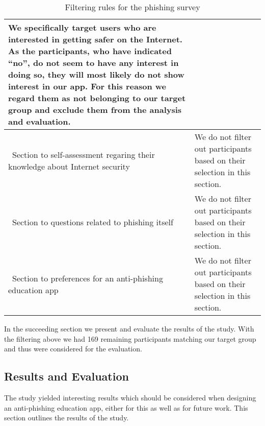 \begin{table}[hHtbp]
\begin{tabular}{ | p{4.5cm} | p{10cm} |}
 We specifically target users who are interested in getting safer on the Internet.
 As the participants, who have indicated ``no'', do not seem to have any interest in doing so, they will most likely do not show interest in our app.
 For this reason we regard them as not belonging to our target group and exclude them from the analysis and evaluation.
\\
    \hline\  Section to self-assessment regaring their knowledge about Internet security &  We do not filter out participants based on their selection in this section.
\\
		\hline\  Section to questions related to phishing itself & We do not filter out participants based on their selection in this section.
 \\
    \hline\  Section to preferences for an anti-phishing education app & We do not filter out participants based on their selection in this section.
\\
    \hline
    \end{tabular}
    \caption{Filtering rules for the phishing survey}
    \label{table:prestudy_filter}
    
\end{table}

In the succeeding section we present and evaluate the results of the study.
 With the filtering above we had 169 remaining participants matching our target group and thus were considered for the evaluation.

\subsection{Results and Evaluation}
The study yielded interesting results which should be considered when designing an anti-phishing education app, either for this as well as for future work.
 This section outlines the results of the study.



